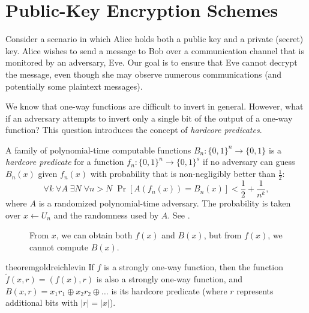 
\section{Public-Key Encryption Schemes}

Consider a scenario in which Alice holds both a public key and a private (secret) key.
Alice wishes to send a message to Bob over a communication channel that is monitored by an adversary, Eve.
Our goal is to ensure that Eve cannot decrypt the message, even though she may observe numerous communications (and potentially some plaintext messages).

We know that one-way functions are difficult to invert in general.
However, what if an adversary attempts to invert only a single bit of the output of a one-way function?
This question introduces the concept of \emph{hardcore predicates}.

\begin{definition}
    A family of polynomial-time computable functions $B_n \colon \{0, 1\}^n \to \{0, 1\}$ is a \emph{hardcore predicate} for a function $f_n \colon \{0, 1\}^n \to \{0, 1\}^s$ if no adversary can guess $B_n(x)$ given $f_n(x)$ with probability that is non-negligibly better than $\frac{1}{2}$:
    \[
        \forall k \; \forall A \; \exists N \; \forall n > N \; \Pr[A(f_n(x)) = B_n(x)] < \frac{1}{2} + \frac{1}{n^{k}},
    \]
    where $A$ is a randomized polynomial-time adversary.
    The probability is taken over $x \gets U_n$ and the randomness used by $A$.
    See .
    
    \begin{figure}[H]
        \centering
        \caption{From $x$, we can obtain both $f(x)$ and $B(x)$, but from $f(x)$, we cannot compute $B(x)$.}
        \label{fig:hardcore_predicate}
    \end{figure}
\end{definition}

\begin{restatable}{theorem}{goldreichlevin} \label{thm:goldreich_levin}
	If $f$ is a strongly one-way function, then the function $\tilde{f}(x, r) = (f(x), r)$ is also a strongly one-way function, and $B(x, r) = x_1 r_1 \oplus x_2 r_2 \oplus \dots$ is its hardcore predicate (where $r$ represents additional bits with $|r| = |x|$).
\end{restatable}

